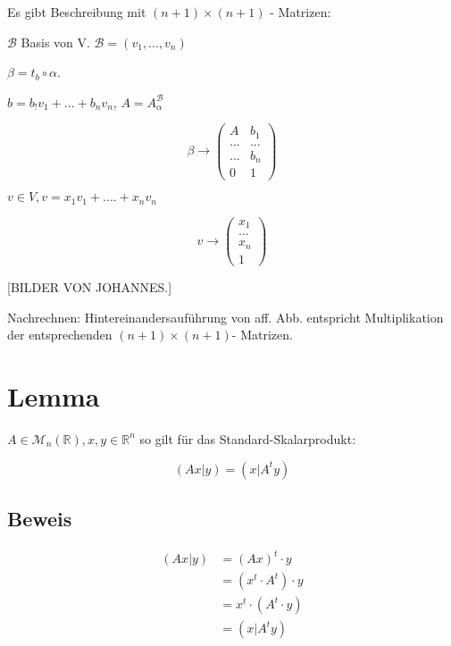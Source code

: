 \documentclass[a4paper, openany]{book}
\begin{document}
\begin{enumerate}[label=(\alph*)]
        Es gibt Beschreibung mit $(n+1) \times (n+1)$ - Matrizen:

        \par \medskip

        $\mathcal{B}$ Basis von V. $\mathcal{B} = (v_1, ..., v_n)$

        $\beta = t_b \circ \alpha$.

        \par \medskip

        $b = b_!v_1 + ... + b_nv_n$, $A = A_{\alpha}^{\mathcal{B}}$

        \[ \beta \rightarrow \begin{pmatrix}A & b_1 \\ ... & ... \\ ... & b_n \\ 0 & 1 \end{pmatrix} \]

        $v \in V, v = x_1v_1 + .... + x_n v_n$

        \[ v \rightarrow \begin{pmatrix}x_1 \\ ... \\ x_n \\ 1 \end{pmatrix} \]

        [BILDER VON JOHANNES.]

        \par \medskip


        Nachrechnen: Hintereinandersauführung von aff. Abb. entspricht Multiplikation der entsprechenden $(n+1) \times (n+1)$- Matrizen.

        \end{enumerate}

        \section{Lemma}

        $A \in \mathcal{M}_n(\mathbb{R}), x,y \in \mathbb{R}^n$ so gilt für das Standard-Skalarprodukt:

        \[ (Ax|y) = (x|A^t y) \]

        \subsection{Beweis}

        \begin{align*}
          (Ax |y )  & = (Ax)^t \cdot y \\
                    & = (x^t \cdot A^t) \cdot y \\
                    & = x^t \cdot (A^t \cdot y) \\
                    & = (x|A^t y)
        \end{align*}
\end{document}

